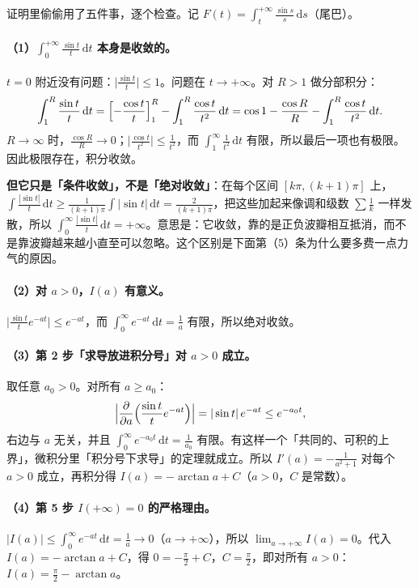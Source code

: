 \documentclass[UTF8,a4paper,11pt]{ctexart}
\renewcommand{\d}{\,\mathrm{d}}
\begin{document}
证明里偷偷用了五件事，逐个检查。记 $F(t)=\displaystyle\int_t^{+\infty}\frac{\sin s}{s}\d s$（尾巴）。

\paragraph{（1）$\displaystyle\int_0^{+\infty}\frac{\sin t}{t}\d t$ 本身是收敛的。}
$t=0$ 附近没有问题：$\bigl|\frac{\sin t}{t}\bigr|\le1$。问题在 $t\to+\infty$。对 $R>1$ 做分部积分：
\[
\int_1^R\frac{\sin t}{t}\d t=\Bigl[-\frac{\cos t}{t}\Bigr]_1^R-\int_1^R\frac{\cos t}{t^2}\d t
=\cos1-\frac{\cos R}{R}-\int_1^R\frac{\cos t}{t^2}\d t .
\]
$R\to\infty$ 时，$\frac{\cos R}{R}\to0$；$\bigl|\frac{\cos t}{t^2}\bigr|\le\frac{1}{t^2}$，而 $\int_1^\infty\frac{1}{t^2}\d t$ 有限，所以最后一项也有极限。因此极限存在，积分收敛。

\textbf{但它只是「条件收敛」，不是「绝对收敛」}：在每个区间 $[k\pi,(k+1)\pi]$ 上，$\int\frac{|\sin t|}{t}\d t\ge\frac{1}{(k+1)\pi}\int|\sin t|\d t=\frac{2}{(k+1)\pi}$，把这些加起来像调和级数 $\sum\frac1k$ 一样发散，所以 $\int_0^\infty\frac{|\sin t|}{t}\d t=+\infty$。意思是：它收敛，靠的是正负波瓣相互抵消，而不是靠波瓣越来越小直至可以忽略。这个区别是下面第（5）条为什么要多费一点力气的原因。

\paragraph{（2）对 $a>0$，$I(a)$ 有意义。}
$\bigl|\frac{\sin t}{t}e^{-at}\bigr|\le e^{-at}$，而 $\int_0^\infty e^{-at}\d t=\frac1a$ 有限，所以绝对收敛。

\paragraph{（3）第 2 步「求导放进积分号」对 $a>0$ 成立。}
取任意 $a_0>0$。对所有 $a\ge a_0$：
\[
\Bigl|\frac{\partial}{\partial a}\Bigl(\frac{\sin t}{t}e^{-at}\Bigr)\Bigr|=|\sin t|\,e^{-at}\le e^{-a_0t},
\]
右边与 $a$ 无关，并且 $\int_0^\infty e^{-a_0t}\d t=\frac1{a_0}$ 有限。有这样一个「共同的、可积的上界」，微积分里「积分号下求导」的定理就成立。所以 $I'(a)=-\frac1{a^2+1}$ 对每个 $a>0$ 成立，再积分得 $I(a)=-\arctan a+C$（$a>0$，$C$ 是常数）。

\paragraph{（4）第 5 步 $I(+\infty)=0$ 的严格理由。}
$|I(a)|\le\int_0^\infty e^{-at}\d t=\frac1a\to0$（$a\to+\infty$），所以 $\lim_{a\to+\infty}I(a)=0$。代入 $I(a)=-\arctan a+C$，得 $0=-\frac\pi2+C$，$C=\frac\pi2$，即对所有 $a>0$：$I(a)=\frac\pi2-\arctan a$。
\end{document}
